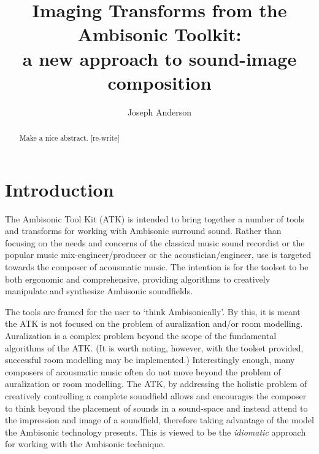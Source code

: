 \documentclass[12pt]{article}
\title{Imaging Transforms from the Ambisonic Toolkit:\\
	a new approach to sound-image composition}
\author{Joseph Anderson}
\date{} %
\begin{document}
\maketitle

\begin{abstract}
  Make a nice abstract. [re-write]
\end{abstract}




\section{Introduction}

The Ambisonic Tool Kit (ATK) is intended to bring together a number of tools and transforms for working with Ambisonic surround sound. Rather than focusing on the needs and concerns of the classical music sound recordist or the popular music mix-engineer/producer or the acoustician/engineer, use is targeted towards the composer of acousmatic music. The intention is for the toolset to be both ergonomic and comprehensive, providing algorithms to creatively manipulate and synthesize Ambisonic soundfields.

The tools are framed for the user to `think Ambisonically'. By this, it is meant the ATK is not focused on the problem of auralization and/or room modelling. Auralization is a complex problem beyond the scope of the fundamental algorithms of the ATK. (It is worth noting, however, with the toolset provided, successful room modelling may be implemented.) Interestingly enough, many composers of acousmatic music often do not move beyond the problem of auralization or room modelling. The ATK, by addressing the holistic problem of creatively controlling a complete soundfield allows and encourages the composer to think beyond the placement of sounds in a sound-space and instead attend to the impression and image of a soundfield, therefore taking advantage of the model the Ambisonic technology presents. This is viewed to be the {\em idiomatic} approach for working with the Ambisonic technique.
\end{document}
